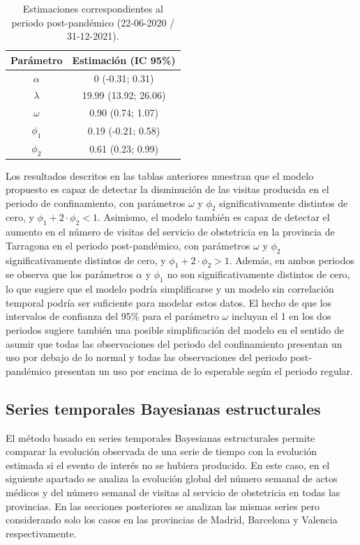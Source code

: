 \documentclass[12pt,twoside]{article} %
\begin{document}
  \begin{table}[H]\caption{Estimaciones correspondientes al periodo post-pandémico (22-06-2020 / 31-12-2021).}
    \centering
    \begin{tabular}{ cc }
        \hline
     \textbf{Parámetro} & \textbf{Estimación (IC 95\%)} \\ 
     \hline
     $\alpha$ &  0 (-0.31; 0.31) \\
     $\lambda$ & 19.99 (13.92; 26.06) \\
     $\omega$ & 0.90 (0.74; 1.07) \\
     $\phi_1$ & 0.19 (-0.21; 0.58) \\
     $\phi_2$ & 0.61 (0.23; 0.99) \\
     \hline
    \end{tabular}
  \end{table}

Los resultados descritos en las tablas anteriores muestran que el modelo propuesto es capaz de detectar la disminución de las visitas producida en el periodo de confinamiento, con parámetros $\omega$ y $\phi_2$ significativamente distintos de cero, y $\phi_1 + 2 \cdot \phi_2 < 1$. Asimismo, el modelo también es capaz de detectar el aumento en el número de visitas del servicio de obstetricia en la provincia de Tarragona en el periodo post-pandémico, con parámetros $\omega$ y $\phi_2$ significativamente distintos de cero, y $\phi_1 + 2 \cdot \phi_2 > 1$. Además, en ambos periodos se observa que los parámetros $\alpha$ y $\phi_1$ no son significativamente distintos de cero, lo que sugiere que el modelo podría simplificarse y un modelo sin correlación temporal podría ser suficiente para modelar estos datos. El hecho de que los intervalos de confianza del 95\% para el parámetro $\omega$ incluyan el 1 en los dos periodos sugiere también una posible simplificación del modelo en el sentido de asumir que todas las observaciones del periodo del confinamiento presentan un uso por debajo de lo normal y todas las observaciones del periodo post-pandémico presentan un uso por encima de lo esperable según el periodo regular. 

\subsection{Series temporales Bayesianas estructurales}
El método basado en series temporales Bayesianas estructurales permite comparar la evolución observada de una serie de tiempo con la evolución estimada si el evento de interés no se hubiera producido. En este caso, en el siguiente apartado se analiza la evolución global del número semanal de actos médicos y del número semanal de visitas al servicio de obstetricia en todas las provincias. En las secciones posteriores se analizan las mismas series pero considerando solo los casos en las provincias de Madrid, Barcelona y Valencia respectivamente.
\end{document}

